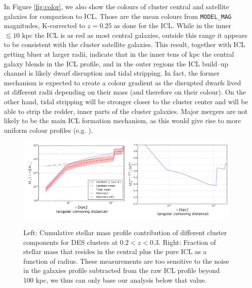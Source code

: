 {In Figure \ref{fig:color}, we also show the colours of cluster central and satellite galaxies for comparison to ICL. Those are the mean colours from \texttt{MODEL\_MAG} magnitudes, K-corrected to $z=0.25$ as done for the ICL. While in the inner $\lesssim 10$ kpc the ICL is as red as most central galaxies, outside this range it appears to be consistent with the cluster satellite galaxies. This result, together with ICL getting bluer at larger radii, indicate that in the inner tens of kpc the central galaxy blends in the ICL profile, and in the outer regions the ICL build--up channel is likely dwarf disruption and tidal stripping. In fact, the former mechanism is expected to create a colour gradient as the disrupted dwarfs lived at different radii depending on their mass (and therefore on their colour). On the other hand, tidal stripping will be stronger closer to the cluster center and will be able to strip the redder, inner parts of the cluster galaxies. Major mergers are not likely to be the main ICL formation mechanism, as this would give rise to more uniform colour profiles (e.g. \citealt{2013A&A...553A..99E}). 

\begin{figure}
\includegraphics[width=0.5\textwidth]{./chapters/chapter6/figs/mtot.png}\includegraphics[width=0.5\textwidth]{./chapters/chapter6/figs/mstar_fraction.png}
\caption{Left: Cumulative stellar mass profile contribution of different cluster components for DES clusters at $0.2<z<0.3$. Right: Fraction of stellar mass that resides in the central plus the pure ICL as a function of radius. These measurements are too sensitive to the noise in the galaxies profile subtracted from the raw ICL profile beyond 100 kpc, we thus can only base our analysis below that value. }
\label{fig:icl_mstar}
\end{figure}

}
